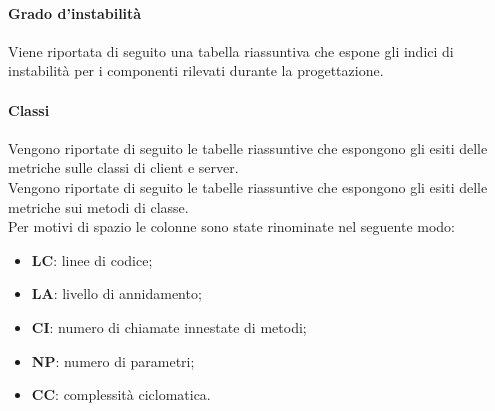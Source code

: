 				\paragraph{Grado d'instabilità}
					Viene riportata di seguito una tabella riassuntiva che espone gli indici di instabilità per i componenti rilevati durante la progettazione.
					
				\paragraph{Classi}
					Vengono riportate di seguito le tabelle riassuntive che espongono gli esiti delle metriche sulle classi di client e server.\\
					
					Vengono riportate di seguito le tabelle riassuntive che espongono gli esiti delle metriche sui metodi di classe.\\
					Per motivi di spazio le colonne sono state rinominate nel seguente modo:
					\begin{itemize}
						\item \textbf{LC}: linee di codice;
						\item \textbf{LA}: livello di annidamento;
						\item \textbf{CI}: numero di chiamate innestate di metodi;
						\item \textbf{NP}: numero di parametri;
						\item \textbf{CC}: complessità ciclomatica.
					\end{itemize}
					